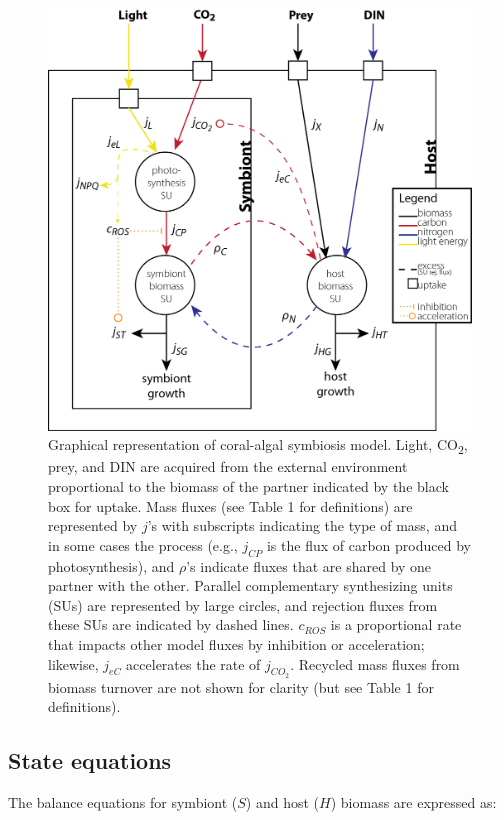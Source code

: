 \documentclass[]{elsarticle} %
\makeatletter
\def\maxwidth{\ifdim\Gin@nat@width>\linewidth\linewidth
\else\Gin@nat@width\fi}
\let\Oldincludegraphics\includegraphics
\renewcommand{\includegraphics}[1]{\Oldincludegraphics[width=\maxwidth]{#1}}
\makeatother
\begin{document}
\begin{figure}[htbp]
\centering
\includegraphics{../img/Fig1.png}
\caption{Graphical representation of coral-algal symbiosis model. Light,
CO\textsubscript{2}, prey, and DIN are acquired from the external
environment proportional to the biomass of the partner indicated by the
black box for uptake. Mass fluxes (see Table 1 for definitions) are
represented by \(j\)'s with subscripts indicating the type of mass, and
in some cases the process (e.g., \(j_{CP}\) is the flux of carbon
produced by photosynthesis), and \(\rho\)'s indicate fluxes that are
shared by one partner with the other. Parallel complementary
synthesizing units (SUs) are represented by large circles, and rejection
fluxes from these SUs are indicated by dashed lines. \(c_{ROS}\) is a
proportional rate that impacts other model fluxes by inhibition or
acceleration; likewise, \(j_{eC}\) accelerates the rate of \(j_{CO_2}\).
Recycled mass fluxes from biomass turnover are not shown for clarity
(but see Table 1 for definitions).}
\end{figure}

\subsection{State equations}\label{state-equations}

The balance equations for symbiont (\(S\)) and host (\(H\)) biomass are
expressed as:
\end{document}
